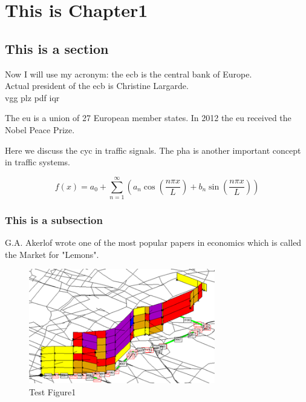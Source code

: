 \chapter{This is Chapter1}

\lipsum[1]%

\section{This is a section}
Now I will use my acronym: the \gls{ecb} is the central bank of Europe. \\
Actual president of the \gls{ecb} is Christine Largarde.\\
\gls{vgg} \gls{plz} \gls{pdf} \gls{iqr}

The \gls{eu} is a union of 27 European member states. In 2012 the \gls{eu} received the Nobel Peace Prize.

Here we discuss the \gls{cyc} in traffic signals. The \gls{pha} is another important concept in traffic systems.

\begin{equation}
    f(x) = a_0 + \sum_{n=1}^{\infty} \left( a_n \cos\left(\frac{n\pi x}{L}\right) + b_n \sin\left(\frac{n\pi x}{L}\right) \right) \label{eq:fourier} 
\end{equation}

\subsection{This is a subsection}
G.A. Akerlof wrote one of the most popular papers in economics which is called the Market for "Lemons"\parencite{akerlof1970}.
\begin{figure}[H] %
    \centering
    \includegraphics[height=50mm]{Images/TestPic.png} %
    \caption{Test Figure1} %
    \label{fig:TestFigure1} %
\end{figure} 

